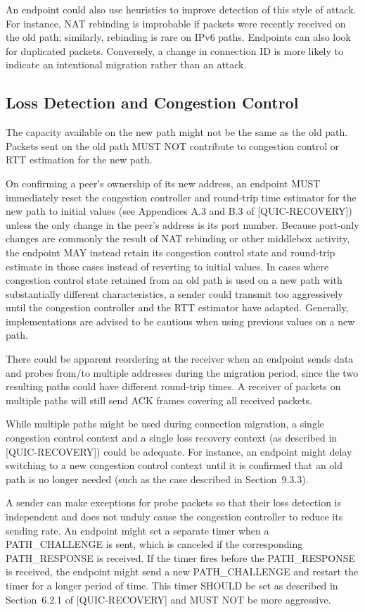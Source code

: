 \documentclass{article}
\begin{document}
An endpoint could also use heuristics to improve detection of this style of attack.  For instance, NAT rebinding is improbable if packets were recently received on the old path; similarly, rebinding is rare on IPv6 paths.  Endpoints can also look for duplicated packets.  Conversely, a change in connection ID is more likely to indicate an intentional migration rather than an attack.

\subsection{Loss Detection and Congestion Control}

The capacity available on the new path might not be the same as the old path.  Packets sent on the old path MUST NOT contribute to congestion control or RTT estimation for the new path.

On confirming a peer's ownership of its new address, an endpoint MUST immediately reset the congestion controller and round-trip time estimator for the new path to initial values (see Appendices A.3 and B.3 of [QUIC-RECOVERY]) unless the only change in the peer's address is its port number.  Because port-only changes are commonly the result of NAT rebinding or other middlebox activity, the endpoint MAY instead retain its congestion control state and round-trip estimate in those cases instead of reverting to initial values.  In cases where congestion control state retained from an old path is used on a new path with substantially different characteristics, a sender could transmit too aggressively until the congestion controller and the RTT estimator have adapted.  Generally, implementations are advised to be cautious when using previous values on a new path.

There could be apparent reordering at the receiver when an endpoint sends data and probes from/to multiple addresses during the migration period, since the two resulting paths could have different round-trip times.  A receiver of packets on multiple paths will still send ACK frames covering all received packets.

While multiple paths might be used during connection migration, a single congestion control context and a single loss recovery context (as described in [QUIC-RECOVERY]) could be adequate.  For instance, an endpoint might delay switching to a new congestion control context until it is confirmed that an old path is no longer needed (such as the case described in Section~9.3.3).

A sender can make exceptions for probe packets so that their loss detection is independent and does not unduly cause the congestion controller to reduce its sending rate.  An endpoint might set a separate timer when a PATH\_CHALLENGE is sent, which is canceled if the corresponding PATH\_RESPONSE is received.  If the timer fires before the PATH\_RESPONSE is received, the endpoint might send a new PATH\_CHALLENGE and restart the timer for a longer period of time. This timer SHOULD be set as described in Section~6.2.1 of [QUIC-RECOVERY] and MUST NOT be more aggressive.
\end{document}
